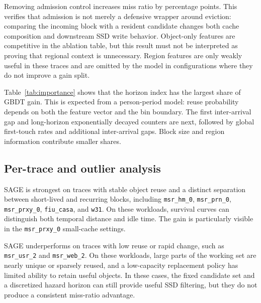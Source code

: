 \documentclass[conference]{IEEEtran}
\begin{document}
\begin{table}[t]
\centrel
\begin{table}[t]
\centering
\caption{Ablations (mean miss ratio; $\Delta$ vs. SAGE in percentage points).}
\label{tab:ablation}
\scriptsize
\setlength{\tabcolsep}{3pt}
\resizebox{\columnwidth}{!}{}
\end{table}

\begin{table}[t]
\centering
\caption{Top features by share of GBDT gain (mean over traces).}
\label{tab:importance}
\scriptsize

\end{table}

Removing admission control increases miss ratio by \ablNoAdmit{} percentage points. This verifies that admission is not merely a defensive wrapper around eviction: comparing the incoming block with a resident candidate changes both cache composition and downstream SSD write behavior. Object-only features are competitive in the ablation table, but this result must not be interpreted as proving that regional context is unnecessary. Region features are only weakly useful in these traces and are omitted by the model in configurations where they do not improve a gain split.

Table~\ref{tab:importance} shows that the horizon index has the largest share of GBDT gain. This is expected from a person-period model: reuse probability depends on both the feature vector and the bin boundary. The first inter-arrival gap and long-horizon exponentially decayed counters are next, followed by global first-touch rates and additional inter-arrival gaps. Block size and region information contribute smaller shares.

\subsection{Per-trace and outlier analysis}
SAGE is strongest on traces with stable object reuse and a distinct separation between short-lived and recurring blocks, including \texttt{msr\_hm\_0}, \texttt{msr\_prn\_0}, \texttt{msr\_prxy\_0}, \texttt{fiu\_casa}, and \texttt{w31}. On these workloads, survival curves can distinguish both temporal distance and idle time. The gain is particularly visible in the \texttt{msr\_prxy\_0} small-cache settings.

SAGE underperforms on traces with low reuse or rapid change, such as \texttt{msr\_usr\_2} and \texttt{msr\_web\_2}. On these workloads, large parts of the working set are nearly unique or sparsely reused, and a low-capacity replacement policy has limited ability to retain useful objects. In these cases, the fixed candidate set and a discretized hazard horizon can still provide useful SSD filtering, but they do not produce a consistent miss-ratio advantage.


\end{table}
\end{document}
